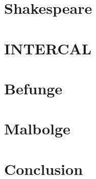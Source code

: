 \documentclass{sig-alternate}
\begin{document}


\newpage
\section{Shakespeare}



\newpage
\section{INTERCAL}



\newpage
\section{Befunge}



\newpage
\section{Malbolge}



\newpage

\section{Conclusion}

\blindtext[5]

\printbibliography
\end{document}
